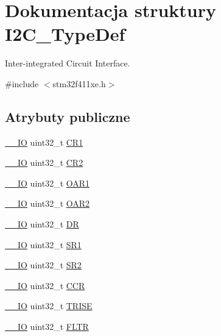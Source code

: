 \hypertarget{struct_i2_c___type_def}{}\section{Dokumentacja struktury I2\+C\+\_\+\+Type\+Def}
\label{struct_i2_c___type_def}


Inter-\/integrated Circuit Interface.  




{\ttfamily \#include $<$stm32f411xe.\+h$>$}

\subsection*{Atrybuty publiczne}
\begin{DoxyCompactItemize}
\item 
\hyperlink{core__sc300_8h_aec43007d9998a0a0e01faede4133d6be}{\+\_\+\+\_\+\+IO} uint32\+\_\+t \hyperlink{struct_i2_c___type_def_a91782f7b81475b0e3c3779273abd26aa}{C\+R1}
\item 
\hyperlink{core__sc300_8h_aec43007d9998a0a0e01faede4133d6be}{\+\_\+\+\_\+\+IO} uint32\+\_\+t \hyperlink{struct_i2_c___type_def_a29eb47db03d5ad7e9b399f8895f1768c}{C\+R2}
\item 
\hyperlink{core__sc300_8h_aec43007d9998a0a0e01faede4133d6be}{\+\_\+\+\_\+\+IO} uint32\+\_\+t \hyperlink{struct_i2_c___type_def_ae8269169fcbdc2ecb580208d99c2f89f}{O\+A\+R1}
\item 
\hyperlink{core__sc300_8h_aec43007d9998a0a0e01faede4133d6be}{\+\_\+\+\_\+\+IO} uint32\+\_\+t \hyperlink{struct_i2_c___type_def_a73988a218be320999c74a641b3d6e3c1}{O\+A\+R2}
\item 
\hyperlink{core__sc300_8h_aec43007d9998a0a0e01faede4133d6be}{\+\_\+\+\_\+\+IO} uint32\+\_\+t \hyperlink{struct_i2_c___type_def_a5c1beaa4935359da1c8f0ceb287f90be}{DR}
\item 
\hyperlink{core__sc300_8h_aec43007d9998a0a0e01faede4133d6be}{\+\_\+\+\_\+\+IO} uint32\+\_\+t \hyperlink{struct_i2_c___type_def_a639be124227c03bb3f5fe0e7faf84995}{S\+R1}
\item 
\hyperlink{core__sc300_8h_aec43007d9998a0a0e01faede4133d6be}{\+\_\+\+\_\+\+IO} uint32\+\_\+t \hyperlink{struct_i2_c___type_def_ac509048af4b9ac67c808d584fdbc712e}{S\+R2}
\item 
\hyperlink{core__sc300_8h_aec43007d9998a0a0e01faede4133d6be}{\+\_\+\+\_\+\+IO} uint32\+\_\+t \hyperlink{struct_i2_c___type_def_a4d81b61d23a54d0d1e28646c3bb9aac5}{C\+CR}
\item 
\hyperlink{core__sc300_8h_aec43007d9998a0a0e01faede4133d6be}{\+\_\+\+\_\+\+IO} uint32\+\_\+t \hyperlink{struct_i2_c___type_def_a9f1a5aee4a26b2fb30e08f88586c436d}{T\+R\+I\+SE}
\item 
\hyperlink{core__sc300_8h_aec43007d9998a0a0e01faede4133d6be}{\+\_\+\+\_\+\+IO} uint32\+\_\+t \hyperlink{struct_i2_c___type_def_a6b540b18ea0370e3e45f69902343320c}{F\+L\+TR}
\end{DoxyCompactItemize}


